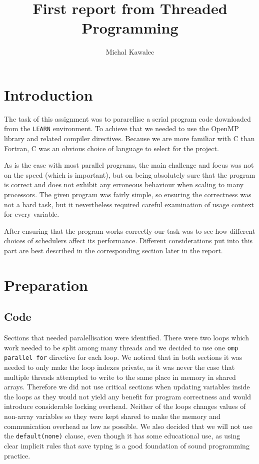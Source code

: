\documentclass[11pt,a4paper]{article}
\begin{document}
\title{First report from Threaded Programming}
\author{Michal Kawalec}
\maketitle

\section{Introduction}
The task of this assignment was to pararellise a serial program code downloaded from the \texttt{LEARN} environment. To achieve that we needed to use the OpenMP library and related compiler directives. Because we are more familiar with C than Fortran, C was an obvious choice of language to select for the project. 

As is the case with most parallel programs, the main challenge and focus was not on the speed (which is important), but on being absolutely sure that the program is correct and does not exhibit any erroneous behaviour when scaling to many processors. The given program was fairly simple, so ensuring the correctness was not a hard task, but it nevertheless required careful examination of usage context for every variable.

After ensuring that the program works correctly our task was to see how different choices of schedulers affect its performance. Different considerations put into this part are best described in the corresponding section later in the report.

\section{Preparation}
\subsection{Code}
Sections that needed paralellisation were identified. There were two loops which work needed to be split among many threads and we decided to use one \texttt{omp parallel for} directive for each loop. We noticed that in both sections it was needed to only make the loop indexes private, as it was never the case that multiple threads attempted to write to the same place in memory in shared arrays. Therefore we did not use critical sections when updating variables inside the loops as they would not yield any benefit for program correctness and would introduce considerable locking overhead. Neither of the loops changes values of non-array variables so they were kept shared to make the memory and communication overhead as low as possible. We also decided that we will not use the \texttt{default(none)} clause, even though it has some educational use, as using clear implicit rules that save typing is a good foundation of sound programming practice.
\end{document}
